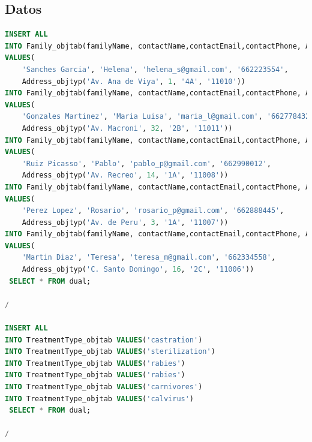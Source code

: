 \documentclass{FR16}
\begin{document}
\subsection{Datos}
\begin{lstlisting}[language=Sql, basicstyle=\scriptsize]
INSERT ALL
INTO Family_objtab(familyName, contactName,contactEmail,contactPhone, Address_obj)
VALUES(
    'Sanches Garcia', 'Helena', 'helena_s@gmail.com', '662223554',
    Address_objtyp('Av. Ana de Viya', 1, '4A', '11010'))
INTO Family_objtab(familyName, contactName,contactEmail,contactPhone, Address_obj)
VALUES(
    'Gonzales Martinez', 'Maria Luisa', 'maria_l@gmail.com', '662778432',
    Address_objtyp('Av. Macroni', 32, '2B', '11011'))
INTO Family_objtab(familyName, contactName,contactEmail,contactPhone, Address_obj)
VALUES(
    'Ruiz Picasso', 'Pablo', 'pablo_p@gmail.com', '662990012',
    Address_objtyp('Av. Recreo', 14, '1A', '11008'))
INTO Family_objtab(familyName, contactName,contactEmail,contactPhone, Address_obj)
VALUES(
    'Perez Lopez', 'Rosario', 'rosario_p@gmail.com', '662888445',
    Address_objtyp('Av. de Peru', 3, '1A', '11007'))
INTO Family_objtab(familyName, contactName,contactEmail,contactPhone, Address_obj)
VALUES(
    'Martin Diaz', 'Teresa', 'teresa_m@gmail.com', '662334558',
    Address_objtyp('C. Santo Domingo', 16, '2С', '11006'))
 SELECT * FROM dual;

/

INSERT ALL
INTO TreatmentType_objtab VALUES('castration')
INTO TreatmentType_objtab VALUES('sterilization')
INTO TreatmentType_objtab VALUES('rabies')
INTO TreatmentType_objtab VALUES('rabies')
INTO TreatmentType_objtab VALUES('carnivores')
INTO TreatmentType_objtab VALUES('calvirus')
 SELECT * FROM dual;

/


\end{lstlisting}
\end{document}
